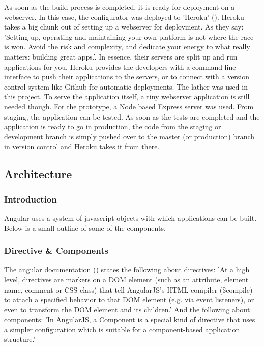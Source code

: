As soon as the build process is completed, it is ready for deployment on a webserver. In this case, the configurator was deployed to 'Heroku' (\cite{heroku}). Heroku takes a big chunk out of setting up a webserver for deployment. As they say: 'Setting up, operating and maintaining your own platform is not where the race is won. Avoid the risk and complexity, and dedicate your energy to what really matters: building great apps.'. In essence, their servers are split up and run applications for you. Heroku provides the developers with a command line interface to push their applications to the servers, or to connect with a version control system like Github for automatic deployments. The lather was used in this project. To serve the application itself, a tiny webserver application is still needed though. For the prototype, a Node based Express server was used.\newline
From staging, the application can be tested. As soon as the tests are completed and the application is ready to go in production, the code from the staging or development branch is simply pushed over to the master (or production) branch in version control and Heroku takes it from there.

\subsection{Architecture}
\subsubsection{Introduction}
Angular uses a system of javascript objects with which applications can be built. Below is a small outline of some of the components.\newline
\subsubsection{Directive \& Components}
The angular documentation (\cite{angularConcepts}) states the following about directives: \newline
'At a high level, directives are markers on a DOM element (such as an attribute, element name, comment or CSS class) that tell AngularJS's HTML compiler (\$compile) to attach a specified behavior to that DOM element (e.g. via event listeners), or even to transform the DOM element and its children.'\newline
And the following about components:\newline
'In AngularJS, a Component is a special kind of directive that uses a simpler configuration which is suitable for a component-based application structure.'\newline

